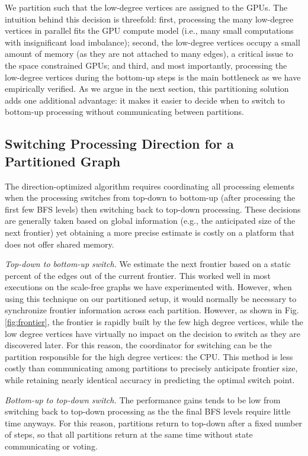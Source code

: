 \documentclass{llncs}
\begin{document}
We partition such that the low-degree vertices are assigned to the GPUs. The intuition behind this decision is threefold: first, processing the many low-degree vertices in parallel fits the GPU compute model (i.e., many small computations with insignificant load imbalance); second, the low-degree vertices occupy a small amount of memory (as they are not attached to many edges), a critical issue to the space constrained GPUs; and third, and most importantly, processing the low-degree vertices during the bottom-up steps is the main bottleneck as we have empirically verified. As we argue in the next section, this partitioning solution adds one additional advantage: it makes it easier to decide when to switch to bottom-up processing without communicating between partitions.
\subsection{Switching Processing Direction for a Partitioned Graph}\label{sec:swapping}The direction-optimized algorithm requires coordinating all processing elements when the processing switches from top-down to bottom-up (after processing the first few BFS levels) then switching back to top-down processing. These decisions are generally taken based on global information \cite{beamer2011searching} \cite{you2014designing} (e.g., the anticipated size of the next frontier) yet obtaining a more precise estimate is costly on a platform that does not offer shared memory.

\textit{Top-down to bottom-up switch.} We estimate the next frontier based on a static percent of the edges out of the current frontier. This worked well in most executions on the scale-free graphs we have experimented with. However, when using this technique on our partitioned setup, it would normally be necessary to synchronize frontier information across each partition. However, as shown in Fig. \ref{fig:frontier}, the frontier is rapidly built by the few high degree vertices, while the low degree vertices have virtually no impact on the decision to switch as they are discovered later. For this reason, the coordinator for switching can be the partition responsible for the high degree vertices: the CPU. This method is less costly than communicating among partitions to precisely anticipate frontier size, while retaining nearly identical accuracy in predicting the optimal switch point.

\textit{Bottom-up to top-down switch.} The performance gains tends to be low from switching back to top-down processing as the the final BFS levels require little time anyways. For this reason, partitions return to top-down after a fixed number of steps, so that all partitions return at the same time without state communicating or voting.
\end{document}
